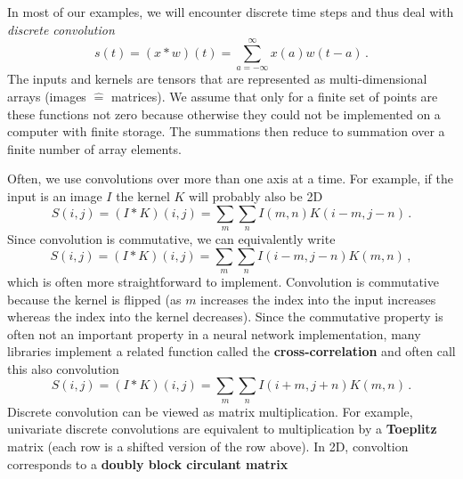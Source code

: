 In most of our examples, we will encounter discrete time steps and
thus deal with \emph{discrete convolution}
\begin{equation*}
  s(t) = (x \ast w)(t) = \sum_{a = -\infty}^\infty x(a) w(t - a)\,.
\end{equation*}
The inputs and kernels are tensors that are represented as
multi-dimensional arrays (\eg images $\hat=$ matrices). We assume that
only for a finite set of points are these functions not zero because
otherwise they could not be implemented on a computer with finite
storage. The summations then reduce to summation over a finite number
of array elements.

Often, we use convolutions over more than one axis at a time. For
example, if the input is an image $I$ the kernel $K$ will probably
also be 2D
\begin{equation*}
  S(i,j) = (I \ast K)(i,j) = \sum_m \sum_n I(m,n)K(i-m, j-n)\,.
\end{equation*}
Since convolution is commutative, we can equivalently write
\begin{equation*}
  S(i,j) = (I \ast K)(i,j) = \sum_m \sum_n I(i-m,j-n)K(m, n)\,,
\end{equation*}
which is often more straightforward to implement. Convolution is
commutative because the kernel is flipped (\ie as $m$ increases the
index into the input increases whereas the index into the kernel
decreases). Since the commutative property is often not an important
property in a neural network implementation, many libraries implement
a related function called the \textbf{cross-correlation} and often
call this also convolution
\begin{equation*}
  S(i,j) = (I \ast K)(i,j) = \sum_m \sum_n I(i+m,j+n)K(m, n)\,.
\end{equation*}
Discrete convolution can be viewed as matrix multiplication. For
example, univariate discrete convolutions are equivalent to
multiplication by a \textbf{Toeplitz} matrix (each row is a shifted
version of the row above). In 2D, convoltion corresponds to a \textbf{doubly
block circulant matrix}

